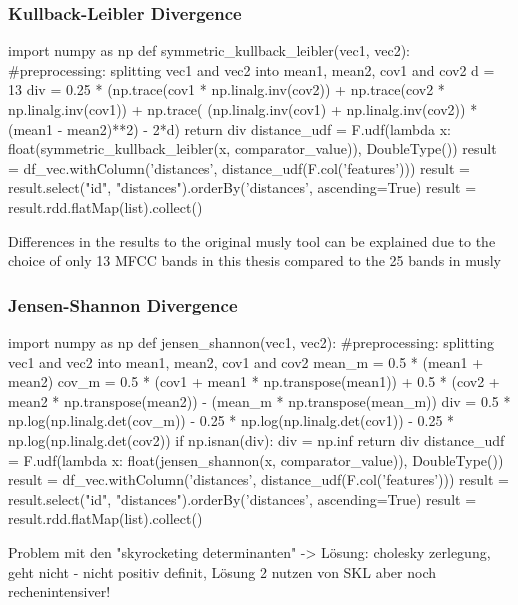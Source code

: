 \subsubsection{Kullback-Leibler Divergence}

\begin{pythonCode}[frame=single,label={lst:kl},caption={kullback leibler},captionpos=b]
import numpy as np
def symmetric_kullback_leibler(vec1, vec2):
	#preprocessing: splitting vec1 and vec2 into mean1, mean2, cov1 and cov2
	d = 13
	div = 0.25 * (np.trace(cov1 * np.linalg.inv(cov2)) + 
		np.trace(cov2 * np.linalg.inv(cov1)) + 
		np.trace( (np.linalg.inv(cov1) + np.linalg.inv(cov2)) * 
		(mean1 - mean2)**2) - 2*d)
	return div
distance_udf = F.udf(lambda x: float(symmetric_kullback_leibler(x, comparator_value)), DoubleType())
result = df_vec.withColumn('distances', distance_udf(F.col('features')))
result = result.select("id", "distances").orderBy('distances', ascending=True)
result = result.rdd.flatMap(list).collect()
\end{pythonCode}

Differences in the results to the original musly tool can be explained due to the choice of only 13 MFCC bands in this thesis compared to the 25 bands in musly\cite{musly1}

\subsubsection{Jensen-Shannon Divergence}

\begin{pythonCode}[frame=single,label={lst:js},caption={jensen shannon},captionpos=b]
import numpy as np
def jensen_shannon(vec1, vec2):
	#preprocessing: splitting vec1 and vec2 into mean1, mean2, cov1 and cov2
	mean_m = 0.5 * (mean1 + mean2)
	cov_m = 0.5 * (cov1 + mean1 * np.transpose(mean1)) + 0.5 * 
		(cov2 + mean2 * np.transpose(mean2)) - (mean_m * np.transpose(mean_m))
	div = 0.5 * np.log(np.linalg.det(cov_m)) - 0.25 * np.log(np.linalg.det(cov1)) - 
		0.25 * np.log(np.linalg.det(cov2))  
	if np.isnan(div):
		div = np.inf
	return div
distance_udf = F.udf(lambda x: float(jensen_shannon(x, comparator_value)), 
	DoubleType())
result = df_vec.withColumn('distances', distance_udf(F.col('features')))
result = result.select("id", "distances").orderBy('distances', ascending=True)
result = result.rdd.flatMap(list).collect()
\end{pythonCode}

Problem mit den "skyrocketing determinanten" -> Lösung: cholesky zerlegung, geht nicht - nicht positiv definit, Lösung 2 nutzen von SKL aber noch rechenintensiver! \cite[p.45]{schnitzer1}

